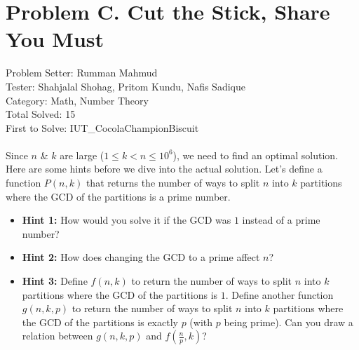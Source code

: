 \section*{Problem C. Cut the Stick, Share You Must}
Problem Setter: Rumman Mahmud \\
Tester: Shahjalal Shohag, Pritom Kundu, Nafis Sadique \\
Category: Math, Number Theory \\
Total Solved: 15 \\
First to Solve: IUT\_CocolaChampionBiscuit \\
\\
Since $n$ \& $k$ are large ($1 \le k < n \le 10^6$), we need to find an optimal solution.
Here are some hints before we dive into the actual solution.
Let’s define a function $P(n,k)$ that returns the number of ways to split $n$ into $k$ partitions 
where the GCD of the partitions is a prime number.
\begin{itemize}
  \item \textbf{Hint 1:} How would you solve it if the GCD was $1$ instead of a prime number?
  \item \textbf{Hint 2:} How does changing the GCD to a prime affect $n$?
  \item \textbf{Hint 3:} Define $f(n,k)$ to return the number of ways to split $n$ into $k$
    partitions where the GCD of the partitions is $1$. Define another function $g(n,k,p)$ to
    return the number of ways to split $n$ into $k$ partitions where the GCD of the partitions
    is exactly $p$ (with $p$ being prime). Can you draw a relation between $g(n,k,p)$ and $f(\frac{n}{p},k)$?
\end{itemize}

